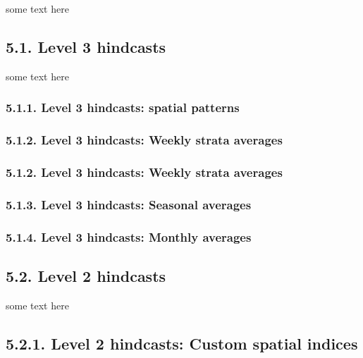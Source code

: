 \documentclass[
]{article}
\begin{document}
some text here

\hypertarget{level-3-hindcasts}{%
\subsection{5.1. Level 3 hindcasts}\label{level-3-hindcasts}}

some text here

\hypertarget{level-3-hindcasts-spatial-patterns}{%
\subsubsection{5.1.1. Level 3 hindcasts: spatial
patterns}\label{level-3-hindcasts-spatial-patterns}}

\hypertarget{level-3-hindcasts-weekly-strata-averages}{%
\subsubsection{5.1.2. Level 3 hindcasts: Weekly strata
averages}\label{level-3-hindcasts-weekly-strata-averages}}

\hypertarget{level-3-hindcasts-weekly-strata-averages-1}{%
\subsubsection{5.1.2. Level 3 hindcasts: Weekly strata
averages}\label{level-3-hindcasts-weekly-strata-averages-1}}

\hypertarget{level-3-hindcasts-seasonal-averages}{%
\subsubsection{5.1.3. Level 3 hindcasts: Seasonal
averages}\label{level-3-hindcasts-seasonal-averages}}

\hypertarget{level-3-hindcasts-monthly-averages}{%
\subsubsection{5.1.4. Level 3 hindcasts: Monthly
averages}\label{level-3-hindcasts-monthly-averages}}

\hypertarget{level-2-hindcasts}{%
\subsection{5.2. Level 2 hindcasts}\label{level-2-hindcasts}}

some text here

\hypertarget{level-2-hindcasts-custom-spatial-indices}{%
\subsection{5.2.1. Level 2 hindcasts: Custom spatial
indices}\label{level-2-hindcasts-custom-spatial-indices}}
\end{document}
